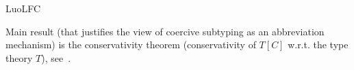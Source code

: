 \begin{entry}{LuoLFC}
\begin{history}
	 \end{history}
	
	\begin{technicalities}
	Main result
(that justifies the view of coercive
subtyping as an abbreviation mechanism)
is the conservativity theorem (conservativity of $T[C]$ w.r.t. the
type theory $T$), see~\cite{Luo:99, SolLuo:02, LuoSolXue:14}.
	\end{technicalities}	
	
	
	
	
	
	
	
	\end{entry}
